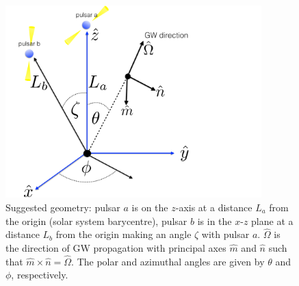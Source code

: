 \documentclass[article, onecolumn, ,nofootinbib,nopreprintnumbers]{revtex4}
\begin{document}
\begin{figure}[b]
		\centering
		\includegraphics[width=3.9in]{pta_geometry.pdf}
		\caption[Typical pulsar timing array geometry]{Suggested geometry: pulsar $a$ is on the $z$-axis at a distance $L_a$ from the origin (solar system barycentre), pulsar $b$ is in the $x$-$z$ plane at a distance $L_b$ from the origin making an angle $\zeta$ with pulsar $a$. $\hat\Omega$ is the direction of GW propagation with principal axes $\hat m$ and $\hat n$ such that  $\hat m \times \hat n =\hat\Omega$. The polar and azimuthal angles are given by $\theta$ and $\phi$, respectively.}
		\label{fig:geometry}
	\end{figure}
\end{document}
